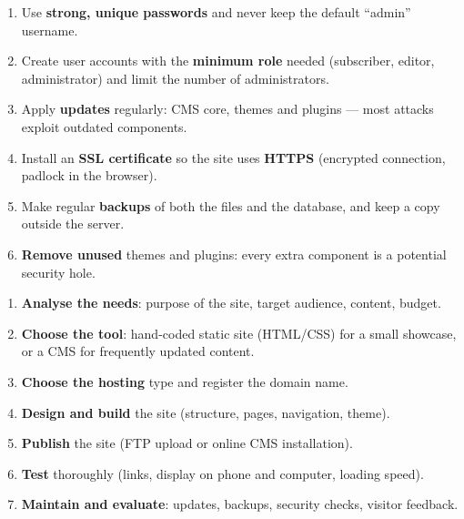 \documentclass[11pt]{article}
\begin{document}
\begin{methode}
\begin{enumerate}
\item Use \textbf{strong, unique passwords} and never keep the default ``admin'' username.
\item Create user accounts with the \textbf{minimum role} needed (subscriber, editor, administrator) and limit the number of administrators.
\item Apply \textbf{updates} regularly: CMS core, themes and plugins — most attacks exploit outdated components.
\item Install an \textbf{SSL certificate} so the site uses \textbf{HTTPS} (encrypted connection, padlock in the browser).
\item Make regular \textbf{backups} of both the files and the database, and keep a copy outside the server.
\item \textbf{Remove unused} themes and plugins: every extra component is a potential security hole.
\end{enumerate}
\end{methode}

\begin{methode}
\begin{enumerate}
\item \textbf{Analyse the needs}: purpose of the site, target audience, content, budget.
\item \textbf{Choose the tool}: hand-coded static site (HTML/CSS) for a small showcase, or a CMS for frequently updated content.
\item \textbf{Choose the hosting} type and register the domain name.
\item \textbf{Design and build} the site (structure, pages, navigation, theme).
\item \textbf{Publish} the site (FTP upload or online CMS installation).
\item \textbf{Test} thoroughly (links, display on phone and computer, loading speed).
\item \textbf{Maintain and evaluate}: updates, backups, security checks, visitor feedback.
\end{enumerate}
\end{methode}
\end{document}
